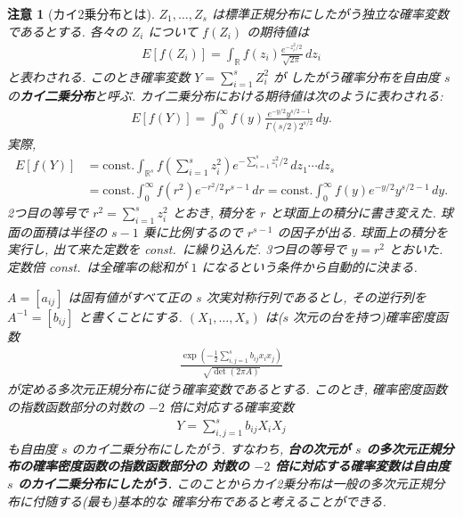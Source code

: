 \documentclass[12pt,twoside]{jarticle}
\newcommand\R{{\mathbb R}} %
\theoremstyle{jplain}
\theoremstyle{jplain}
\theoremstyle{jplain}
\newtheorem*{remark*}{注意}
\numberwithin{theorem}{section}
\numberwithin{equation}{section}
\numberwithin{figure}{section}
\numberwithin{table}{section}
\begin{document}
\begin{remark*}[カイ2乗分布とは]
$Z_1,\ldots,Z_s$ は標準正規分布にしたがう独立な確率変数であるとする.
各々の $Z_i$ について $f(Z_i)$ の期待値は
\begin{align*}
E[f(Z_i)] = \int_\R f(z_i)\frac{e^{-z_i^2/2}}{\sqrt{2\pi}}\,dz_i
\end{align*}
と表わされる. 
このとき確率変数 $Y=\sum_{i=1}^s Z_i^2$ が
したがう確率分布を自由度 $s$ の{\bf カイ二乗分布}と呼ぶ.
カイ二乗分布における期待値は次のように表わされる:
\begin{align*}
E[f(Y)] = \int_0^\infty f(y) \frac{e^{-y/2}y^{s/2-1}}{\Gamma(s/2)2^{s/2}}\,dy.
\end{align*}
実際, 
\begin{align*}
E[f(Y)]
&=\text{const.}
\int_{\R^s} f\left(\sum_{i=1}^s z_i^2\right)e^{-\sum_{i=1}^s z_i^2/2}\,dz_1\cdots dz_s
\\ &
=\text{const.} \int_0^\infty f(r^2)e^{-r^2/2}r^{s-1}\,dr
=\text{const.} \int_0^\infty f(y)e^{-y/2}y^{s/2-1}\,dy.
\end{align*}
2つ目の等号で $r^2=\sum_{i=1}^s z_i^2$ とおき, 積分を $r$ と球面上の積分に書き変えた.
球面の面積は半径の $s-1$ 乗に比例するので $r^{s-1}$ の因子が出る. 
球面上の積分を実行し, 出て来た定数を const.\ に繰り込んだ. 
3つ目の等号で $y=r^2$ とおいた.
定数倍 const.\ は全確率の総和が $1$ になるという条件から自動的に決まる.

$A=[a_{ij}]$ は固有値がすべて正の $s$ 次実対称行列であるとし, 
その逆行列を $A^{-1}=[b_{ij}]$ と書くことにする.
$(X_1,\ldots,X_s)$ は($s$ 次元の台を持つ)確率密度函数
\begin{align*}
 \frac{\exp\left(-\frac12\sum_{i,j=1}^s b_{ij}x_ix_j\right)}{\sqrt{\det(2\pi A)}}
\end{align*}
が定める多次元正規分布に従う確率変数であるとする.
このとき, 確率密度函数の指数函数部分の対数の $-2$ 倍に対応する確率変数
\begin{align*}
Y=\sum_{i,j=1}^s b_{ij}X_i X_j
\end{align*} 
も自由度 $s$ のカイ二乗分布にしたがう.
すなわち, {\bf 台の次元が $s$ の多次元正規分布の確率密度函数の指数函数部分の
対数の $-2$ 倍に対応する確率変数は自由度 $s$ のカイ二乗分布にしたがう.}
このことからカイ2乗分布は一般の多次元正規分布に付随する(最も)基本的な
確率分布であると考えることができる.


\end{remark*}
\end{document}
